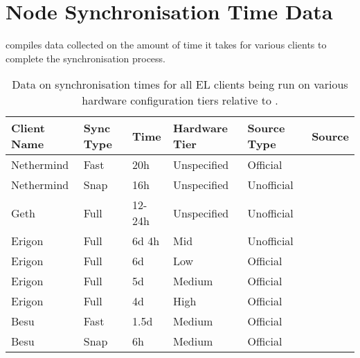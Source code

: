 \chapter{Node Synchronisation Time Data}
\label{Appendix B}
 compiles data collected on the amount of time it takes for various clients to complete the synchronisation process. 

\begin{table}[htb!]
\centering
\begin{tabular}{|l|l|l|l|l|l|}
\hline
\textbf{Client Name} & \textbf{Sync Type} & \textbf{Time} & \textbf{Hardware Tier} & \textbf{Source Type} & \textbf{Source} \\ \hline
Nethermind & Fast & 20h    & Unspecified & Official   & \cite{2022SyncDocs} \\ \hline
Nethermind & Snap & 16h    & Unspecified & Unofficial & \cite{3Ethstakerc} \\ \hline
Geth       & Full & 12-24h & Unspecified & Unofficial & \cite{3Ethstakerb} \\ \hline
Erigon     & Full & 6d 4h  & Mid         & Unofficial & \cite{3Ethstaker}  \\ \hline
Erigon     & Full & 6d     & Low         & Official   & \cite{2022Ledgerwatch/erigon:Frontier}  \\ \hline
Erigon     & Full & 5d     & Medium      & Official   & \cite{2022Ledgerwatch/erigon:Frontier}  \\ \hline
Erigon     & Full & 4d     & High        & Official   &\cite{2022Ledgerwatch/erigon:Frontier} \\ \hline
Besu       & Fast & 1.5d   & Medium      & Official   & \cite{SyncBesu} \\ \hline
Besu       & Snap & 6h     & Medium      & Official   & \cite{SyncBesu} \\ \hline
\end{tabular}
\caption{Data on synchronisation times for all EL clients being run on various hardware configuration tiers relative to  .}
\label{Table:ELRunTime}
\end{table}
